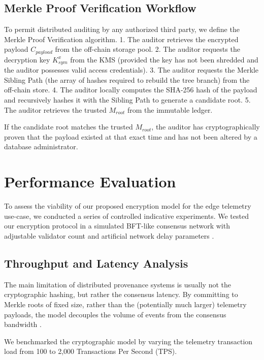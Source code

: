 \documentclass[conference]{IEEEtran}
\begin{document}
\subsection{Merkle Proof Verification Workflow}
To permit distributed auditing by any authorized third party, we define the Merkle Proof Verification algorithm. 
1. The auditor retrieves the encrypted payload $C_{payload}$ from the off-chain storage pool.
2. The auditor requests the decryption key $K_{sym}^{x}$ from the KMS (provided the key has not been shredded and the auditor possesses valid access credentials).
3. The auditor requests the Merkle Sibling Path (the array of hashes required to rebuild the tree branch) from the off-chain store.
4. The auditor locally computes the SHA-256 hash of the payload and recursively hashes it with the Sibling Path to generate a candidate root.
5. The auditor retrieves the trusted $M_{root}$ from the immutable ledger.

If the candidate root matches the trusted $M_{root}$, the auditor has cryptographically proven that the payload existed at that exact time and has not been altered by a database administrator.

\section{Performance Evaluation}

To assess the viability of our proposed encryption model for the edge telemetry use-case, we conducted a series of controlled indicative experiments. We tested our encryption protocol in a simulated BFT-like consensus network with adjustable validator count and artificial network delay parameters \cite{b15}.

\subsection{Throughput and Latency Analysis}

The main limitation of distributed provenance systems is usually not the cryptographic hashing, but rather the consensus latency. By committing to Merkle roots of fixed size, rather than the (potentially much larger) telemetry payloads, the model decouples the volume of events from the consensus bandwidth \cite{b16}.

We benchmarked the cryptographic model by varying the telemetry transaction load from 100 to 2,000 Transactions Per Second (TPS).
\end{document}
